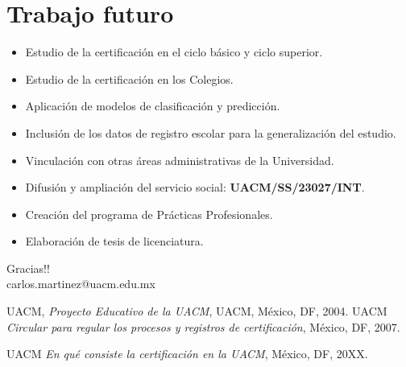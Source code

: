\documentclass[xcolor=dvipsnames]{beamer}
\begin{document}
\section{Trabajo futuro}


\begin{frame}
\begin{itemize}
\item Estudio de la certificaci\'on en el ciclo b\'asico y ciclo superior.

\item Estudio de la certificaci\'on en los Colegios.

\item Aplicaci\'on de modelos de clasificaci\'on y predicci\'on.

\item Inclusi\'on de los datos de registro escolar para la generalizaci\'on del estudio.

\item Vinculaci\'on con otras \'areas administrativas de la Universidad.

\item Difusi\'on y ampliaci\'on del servicio social: \textbf{UACM/SS/23027/INT}.

\item Creaci\'on del programa de Pr\'acticas Profesionales.

\item Elaboraci\'on de tesis de licenciatura.



\end{itemize}

\end{frame}




\begin{frame}

\begin{centering}
{\Huge{ Gracias!!\\
\medskip
carlos.martinez@uacm.edu.mx
}}

\end{centering}
\end{frame}




\begin{frame}

\begin{thebibliography}{20}
 \textsc{UACM},
\textit{Proyecto Educativo de la UACM},
UACM, M\'exico, DF, 2004.
 \textsc{UACM} 
\textit{Circular para regular los procesos y registros de certificaci\'on}, M\'exico, DF, 2007.

 \textsc{UACM} 
\textit{En qu\'e consiste la certificaci\'on en la UACM}, M\'exico, DF, 20XX.


\end{thebibliography}
\end{frame}
\end{document}
